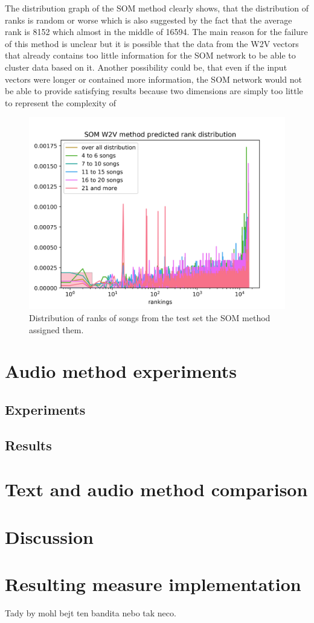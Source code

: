 The distribution graph of the SOM method clearly shows, that the distribution of ranks is random or worse which is also suggested by the fact that the average rank is 8152 which almost in the middle of 16594. The main reason for the failure of this method is unclear but it is possible that the data from the W2V vectors that already contains too little information for the SOM network to be able to cluster data based on it. Another possibility could be, that even if the input vectors were longer or contained more information, the SOM network would not be able to provide satisfying results because two dimensions are simply too little to represent the complexity of 
\begin{figure}[h]
    \centering
	\includegraphics[width=120mm]{./img/som_w2v_graph.png}
	\caption{Distribution of ranks of songs from the test set the SOM method assigned them.}
	\label{fig:som_distribution}
\end{figure}
\section{Audio method experiments}

\subsection{Experiments}
\subsection{Results}

\section{Text and audio method comparison}

\section{Discussion}

\section{Resulting measure implementation}
Tady by mohl bejt ten bandita nebo tak neco.